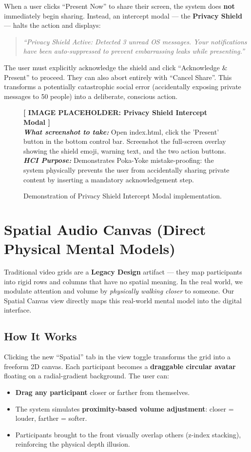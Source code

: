\documentclass[12pt,a4paper]{article}
\newcommand{\imageplaceholder}[3]{
    \begin{figure}[H]
        \centering
        \begin{tcolorbox}[colback=placeholderbg,colframe=placeholderborder,arc=4mm,height=7.5cm,valign=center,halign=center]
            {\Large\textbf{\textcolor{hciblue}{[ IMAGE PLACEHOLDER: #1 ]}}}\\[0.5cm]
            \textit{\textbf{What screenshot to take:}} #2\\[0.3cm]
            \textit{\textbf{HCI Purpose:}} #3
        \end{tcolorbox}
        \caption{Demonstration of #1 implementation.}
    \end{figure}
}
\begin{document}
When a user clicks ``Present Now'' to share their screen, the system does \textbf{not} immediately begin sharing. Instead, an intercept modal — the \textbf{Privacy Shield} — halts the action and displays:

\begin{quote}
\textit{``Privacy Shield Active: Detected 3 unread OS messages. Your notifications have been auto-suppressed to prevent embarrassing leaks while presenting.''}
\end{quote}

The user must explicitly acknowledge the shield and click ``Acknowledge \& Present'' to proceed. They can also abort entirely with ``Cancel Share''. This transforms a potentially catastrophic social error (accidentally exposing private messages to 50 people) into a deliberate, conscious action.

\imageplaceholder{Privacy Shield Intercept Modal}{Open index.html, click the 'Present' button in the bottom control bar. Screenshot the full-screen overlay showing the shield emoji, warning text, and the two action buttons.}{Demonstrates Poka-Yoke mistake-proofing: the system physically prevents the user from accidentally sharing private content by inserting a mandatory acknowledgement step.}

\section{Spatial Audio Canvas (Direct Physical Mental Models)}
Traditional video grids are a \textbf{Legacy Design} artifact — they map participants into rigid rows and columns that have no spatial meaning. In the real world, we modulate attention and volume by \textit{physically walking closer} to someone. Our Spatial Canvas view directly maps this real-world mental model into the digital interface.

\subsection{How It Works}
Clicking the new ``Spatial'' tab in the view toggle transforms the grid into a freeform 2D canvas. Each participant becomes a \textbf{draggable circular avatar} floating on a radial-gradient background. The user can:
\begin{itemize}
    \item \textbf{Drag any participant} closer or farther from themselves.
    \item The system simulates \textbf{proximity-based volume adjustment}: closer = louder, farther = softer.
    \item Participants brought to the front visually overlap others (z-index stacking), reinforcing the physical depth illusion.
\end{itemize}
\end{document}

